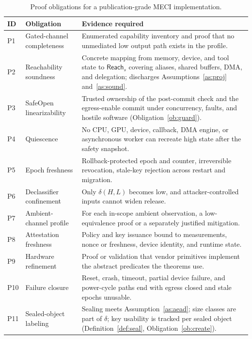 \documentclass[11pt,letterpaper]{article}
\theoremstyle{plain}
\theoremstyle{definition}
\newcommand{\Reach}{\mathsf{Reach}}
\begin{document}
\begin{table}[t]
\centering\small
\caption{Proof obligations for a publication-grade MECI implementation.}\label{tab:obl}
\begin{tabularx}{\textwidth}{@{}p{0.6cm}p{3.3cm}Y@{}}
\toprule
ID & Obligation & Evidence required\\
\midrule
P1 & Gated-channel completeness & Enumerated capability inventory and proof that no unmediated low output path exists in the profile.\\
P2 & Reachability soundness & Concrete mapping from memory, device, and tool state to $\Reach_s$ covering aliases, shared buffers, DMA, and delegation; discharges Assumptions~\ref{as:proj} and~\ref{as:sound}.\\
P3 & SafeOpen linearizability & Trusted ownership of the post-commit check and the egress-enable commit under concurrency, faults, and hostile software (Obligation~\ref{ob:guard}).\\
P4 & Quiescence & No CPU, GPU, device, callback, DMA engine, or asynchronous worker can recreate high state after the safety snapshot.\\
P5 & Epoch freshness & Rollback-protected epoch and counter, irreversible revocation, stale-key rejection across restart and migration.\\
P6 & Declassifier confinement & Only $\delta(H,L)$ becomes low, and attacker-controlled inputs cannot widen release.\\
P7 & Ambient-channel profile & For each in-scope ambient observation, a low-equivalence proof or a separately justified mitigation.\\
P8 & Attestation freshness & Policy and key issuance bound to measurements, nonce or freshness, device identity, and runtime state.\\
P9 & Hardware refinement & Proof or validation that vendor primitives implement the abstract predicates the theorems use.\\
P10 & Failure closure & Reset, crash, timeout, partial device failure, and power-cycle paths end with egress closed and stale epochs unusable.\\
P11 & Sealed-object labeling & Sealing meets Assumption~\ref{as:aead}; size classes are part of $\delta$; key usability is tracked per sealed object (Definition~\ref{def:seal}, Obligation~\ref{ob:create}).\\
\bottomrule
\end{tabularx}
\end{table}
\end{document}

